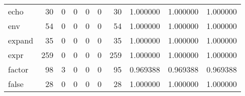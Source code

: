\begin{longtable}{lrrrrrrrrr}
echo      &                                        30 &                                                  0 &                                                  0 &                                                  0 &                                                  0 &                                                 30 &                                           1.000000 &                               1.000000 &                             1.000000 \\
env       &                                        54 &                                                  0 &                                                  0 &                                                  0 &                                                  0 &                                                 54 &                                           1.000000 &                               1.000000 &                             1.000000 \\
expand    &                                        35 &                                                  0 &                                                  0 &                                                  0 &                                                  0 &                                                 35 &                                           1.000000 &                               1.000000 &                             1.000000 \\
expr      &                                       259 &                                                  0 &                                                  0 &                                                  0 &                                                  0 &                                                259 &                                           1.000000 &                               1.000000 &                             1.000000 \\
factor    &                                        98 &                                                  3 &                                                  0 &                                                  0 &                                                  0 &                                                 95 &                                           0.969388 &                               0.969388 &                             0.969388 \\
false     &                                        28 &                                                  0 &                                                  0 &                                                  0 &                                                  0 &                                                 28 &                                           1.000000 &                               1.000000 &                             1.000000 \\

\end{longtable}
